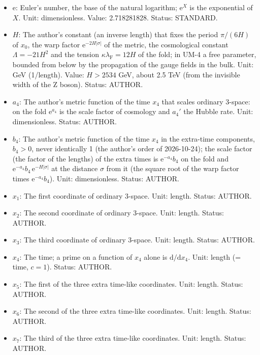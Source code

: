 \documentclass[
  10pt,
]{article}
\begin{document}
\begin{itemize}
  \(\mathrm{d}\sigma = \lvert\cot z\rvert\,\mathrm{d}x_0\),
  \(\sigma = \mathrm{sgn}(\pi/2 - z)\ln(\sin z)/(6H)\) on one period
  \(0 < z < \pi\); \(\sigma = 0\) is the fold \(z = \pi/2\),
  \(\sigma \to \mp\infty\) the tips \(z \to 0, \pi\); one period of
  \(x_0\) is the whole line \(-\infty < \sigma < \infty\). Unit: length.
  Status: DERIVED.
\item
  \(\mathrm{e}\): Euler's number, the base of the natural logarithm;
  \(\mathrm{e}^{X}\) is the exponential of \(X\). Unit: dimensionless.
  Value: 2.718281828. Status: STANDARD.
\item
  \(H\): The author's constant (an inverse length) that fixes the period
  \(\pi/(6H)\) of \(x_0\), the warp factor
  \(\mathrm{e}^{-2H\lvert\sigma\rvert}\) of the metric, the cosmological
  constant \(\Lambda = -21H^2\) and the tension
  \(\kappa\lambda_{\mathrm{F}} = 12H\) of the fold; in UM-4 a free
  parameter, bounded from below by the propagation of the gauge fields
  in the bulk. Unit: GeV (1/length). Value: \(H > 2534\) GeV, about 2.5
  TeV (from the invisible width of the Z boson). Status: AUTHOR.
\item
  \(a_4\): The author's metric function of the time \(x_4\) that scales
  ordinary 3-space: on the fold \(\mathrm{e}^{a_4}\) is the scale factor
  of cosmology and \(a_4'\) the Hubble rate. Unit: dimensionless.
  Status: AUTHOR.
\item
  \(b_4\): The author's metric function of the time \(x_4\) in the
  extra-time components, \(b_4 > 0\), never identically 1 (the author's
  order of 2026-10-24); the scale factor (the factor of the lengths) of
  the extra times is \(\mathrm{e}^{-a_4}b_4\) on the fold and
  \(\mathrm{e}^{-a_4}b_4\,\mathrm{e}^{-H\lvert\sigma\rvert}\) at the
  distance \(\sigma\) from it (the square root of the warp factor times
  \(\mathrm{e}^{-a_4}b_4\)). Unit: dimensionless. Status: AUTHOR.
\item
  \(x_1\): The first coordinate of ordinary 3-space. Unit: length.
  Status: AUTHOR.
\item
  \(x_2\): The second coordinate of ordinary 3-space. Unit: length.
  Status: AUTHOR.
\item
  \(x_3\): The third coordinate of ordinary 3-space. Unit: length.
  Status: AUTHOR.
\item
  \(x_4\): The time; a prime on a function of \(x_4\) alone is
  \(\mathrm{d}/\mathrm{d}x_4\). Unit: length (= time, \(c = 1\)).
  Status: AUTHOR.
\item
  \(x_5\): The first of the three extra time-like coordinates. Unit:
  length. Status: AUTHOR.
\item
  \(x_6\): The second of the three extra time-like coordinates. Unit:
  length. Status: AUTHOR.
\item
  \(x_7\): The third of the three extra time-like coordinates. Unit:
  length. Status: AUTHOR.
\end{itemize}
\end{document}
